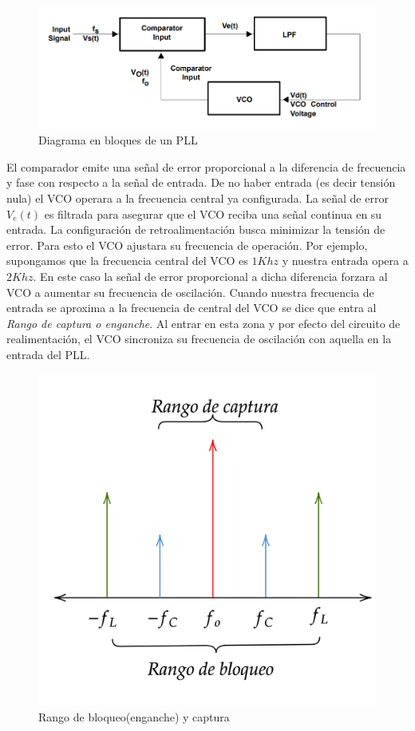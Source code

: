 	\begin{figure}[H]
		\includegraphics[width=\linewidth]{ImagenesVarias/PLLblockDiagram.PNG}
		\caption{Diagrama en bloques de un PLL}
	\end{figure}
El comparador emite una señal de error proporcional a la diferencia de frecuencia y fase con respecto a la señal de entrada. De no haber entrada (es decir tensión nula) el VCO operara a la frecuencia central ya configurada. La señal de error $V_e(t)$ es filtrada para asegurar que el VCO reciba una señal continua en su entrada. La configuración de retroalimentación busca minimizar la tensión de error. Para esto el VCO ajustara su frecuencia de operación. Por ejemplo, supongamos que la frecuencia central del VCO es $1Khz$ y nuestra entrada opera a $2Khz$. En este caso la señal de error proporcional a dicha diferencia forzara al VCO a aumentar su frecuencia de oscilación. Cuando nuestra frecuencia de entrada se aproxima a la frecuencia de central del VCO se dice que entra al \emph{Rango de captura o enganche}. Al entrar en esta zona y por efecto del circuito de realimentación, el VCO sincroniza su frecuencia de oscilación con aquella en la entrada del PLL.



\begin{figure}[H]
	\centering
	\includegraphics[scale=0.3]{ImagenesVarias/PLL_range2.png}
	\caption{Rango de bloqueo(enganche) y captura}
	\label{blockLockRange}
\end{figure}


